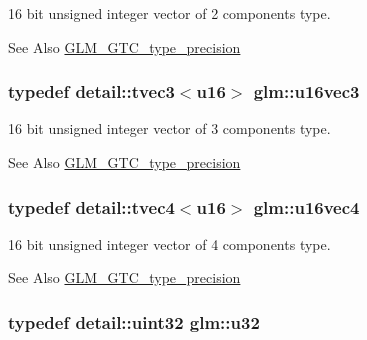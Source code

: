 16 bit unsigned integer vector of 2 components type. 

\begin{DoxySeeAlso}{See Also}
\hyperlink{group__gtc__type__precision}{G\-L\-M\-\_\-\-G\-T\-C\-\_\-type\-\_\-precision} 
\end{DoxySeeAlso}
\hypertarget{group__gtc__type__precision_gadce584ceb1de400c392cb2df1b343df9}{
\subsubsection[{u16vec3}]{\setlength{\rightskip}{0pt plus 5cm}typedef detail\-::tvec3$<$u16$>$ {\bf glm\-::u16vec3}}}\label{group__gtc__type__precision_gadce584ceb1de400c392cb2df1b343df9}


16 bit unsigned integer vector of 3 components type. 

\begin{DoxySeeAlso}{See Also}
\hyperlink{group__gtc__type__precision}{G\-L\-M\-\_\-\-G\-T\-C\-\_\-type\-\_\-precision} 
\end{DoxySeeAlso}
\hypertarget{group__gtc__type__precision_ga0144c89f52e4b5ca057f5349cdd80bf2}{
\subsubsection[{u16vec4}]{\setlength{\rightskip}{0pt plus 5cm}typedef detail\-::tvec4$<$u16$>$ {\bf glm\-::u16vec4}}}\label{group__gtc__type__precision_ga0144c89f52e4b5ca057f5349cdd80bf2}


16 bit unsigned integer vector of 4 components type. 

\begin{DoxySeeAlso}{See Also}
\hyperlink{group__gtc__type__precision}{G\-L\-M\-\_\-\-G\-T\-C\-\_\-type\-\_\-precision} 
\end{DoxySeeAlso}
\hypertarget{group__gtc__type__precision_ga54e837745059fd29017bed71cfa0a8db}{
\subsubsection[{u32}]{\setlength{\rightskip}{0pt plus 5cm}typedef detail\-::uint32 {\bf glm\-::u32}}}\label{group__gtc__type__precision_ga54e837745059fd29017bed71cfa0a8db}


